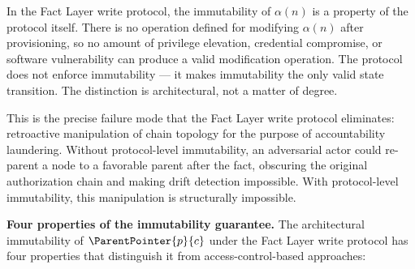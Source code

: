 In the Fact Layer write protocol, the immutability of $\alpha(n)$ is a property of the protocol itself. There is no operation defined for modifying $\alpha(n)$ after provisioning, so no amount of privilege elevation, credential compromise, or software vulnerability can produce a valid modification operation. The protocol does not enforce immutability --- it makes immutability the only valid state transition. The distinction is architectural, not a matter of degree.

This is the precise failure mode that the Fact Layer write protocol eliminates: retroactive manipulation of chain topology for the purpose of accountability laundering. Without protocol-level immutability, an adversarial actor could re-parent a node to a favorable parent after the fact, obscuring the original authorization chain and making drift detection impossible. With protocol-level immutability, this manipulation is structurally impossible.

\medskip
\noindent\textbf{Four properties of the immutability guarantee.} The architectural immutability of $\ParentPointer{p}{c}$ under the Fact Layer write protocol has four properties that distinguish it from access-control-based approaches:

